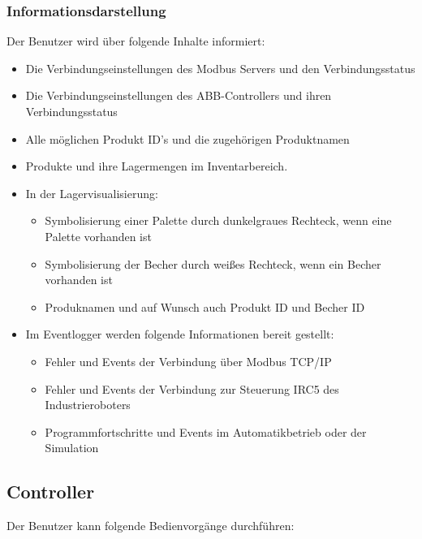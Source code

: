 \subsubsection{Informationsdarstellung}
Der Benutzer wird über folgende Inhalte informiert:\\
\begin{itemize}
    \item Die Verbindungseinstellungen des Modbus Servers und den Verbindungsstatus
    \item Die Verbindungseinstellungen des ABB-Controllers und ihren Verbindungsstatus
    \item Alle möglichen Produkt ID's und die zugehörigen Produktnamen
    \item Produkte und ihre Lagermengen im Inventarbereich.
    \item In der Lagervisualisierung:
    \begin{itemize}
        \item Symbolisierung einer Palette durch dunkelgraues Rechteck, wenn eine Palette vorhanden ist
        \item Symbolisierung der Becher durch weißes Rechteck, wenn ein Becher vorhanden ist
        \item Produknamen und auf Wunsch auch Produkt ID und Becher ID
    \end{itemize}
    \item Im Eventlogger werden folgende Informationen bereit gestellt:
    \begin{itemize}
        \item Fehler und Events der Verbindung über Modbus TCP/IP
        \item Fehler und Events der Verbindung zur Steuerung IRC5 des Industrieroboters
        \item Programmfortschritte und Events im Automatikbetrieb oder der Simulation
    \end{itemize}
\end{itemize}

\subsection{Controller}

Der Benutzer kann folgende Bedienvorgänge durchführen: \\


